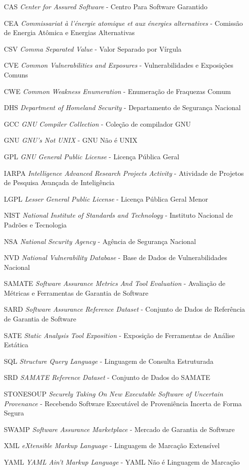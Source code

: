 \begin{siglas}
\item[CAS] \textit{Center for Assured Software} - Centro Para Software Garantido
\item[CEA] \textit{Commissariat à l'énergie atomique et aux énergies alternatives} - Comissão de Energia Atômica e Energias Alternativas
\item[CSV] \textit{Comma Separated Value} - Valor Separado por Vírgula
\item[CVE] \textit{Common Vulnerabilities and Exposures} - Vulnerabilidades e Exposições Comuns
\item[CWE] \textit{Common Weakness Enumeration} - Enumeração de Fraquezas Comum
\item[DHS] \textit{Department of Homeland Security} - Departamento de Segurança Nacional
\item[GCC] \textit{GNU Compiler Collection} - Coleção de compilador GNU
\item[GNU] \textit{GNU's Not UNIX} - GNU Não é UNIX
\item[GPL] \textit{GNU General Public License} - Licença Pública Geral
\item[IARPA] \textit{Intelligence Advanced Research Projects Activity} - Atividade de Projetos de Pesquisa Avançada de Inteligência
\item[LGPL] \textit{Lesser General Public License} - Licença Pública Geral Menor
\item[NIST] \textit{National Institute of Standards and Technology} - Instituto Nacional de Padrões e Tecnologia
\item[NSA] \textit{National Security Agency} - Agência de Segurança Nacional
\item[NVD] \textit{National Vulnerability Database} - Base de Dados de Vulnerabilidades Nacional
\item[SAMATE] \textit{Software Assurance Metrics And Tool Evaluation} - Avaliação de Métricas e Ferramentas de Garantia de Software
\item[SARD] \textit{Software Assurance Reference Dataset} - Conjunto de Dados de Referência de Garantia de Software
\item[SATE] \textit{Static Analysis Tool Exposition} - Exposição de Ferramentas de Análise Estática
\item[SQL] \textit{Structure Query Language} - Linguagem de Consulta Estruturada
\item[SRD] \textit{SAMATE Reference Dataset} - Conjunto de Dados do SAMATE
\item[STONESOUP] \textit{Securely Taking On New Executable Software of Uncertain Provenance} - Recebendo Software Executável de Proveniência Incerta de Forma Segura
\item[SWAMP] \textit{Software Assurance Marketplace} - Mercado de Garantia de Software
\item[XML] \textit{eXtensible Markup Language} - Linguagem de Marcação Extensível
\item[YAML] \textit{YAML Ain't Markup Language} - YAML Não é Linguagem de Marcação
\end{siglas}
